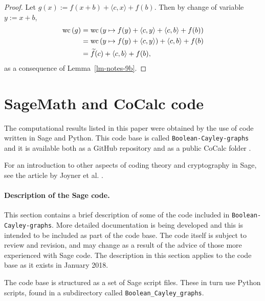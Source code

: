 \begin{proof}
Let $g(x) := f(x+b) + \langle c, x \rangle + f(b)$.
Then by change of variable $y:=x+b$,
\begin{align*}
\operatorname{wc}\left(g\right)
&=
\operatorname{wc}\left(y \mapsto f(y) + \langle c, y \rangle + \langle c, b \rangle + f(b)\right)
\\
&=
\operatorname{wc}\left(y \mapsto f(y) + \langle c, y \rangle\right) + \langle c, b \rangle + f(b)
\\
&=
\widetilde{f}(c) + \langle c, b \rangle + f(b),
\end{align*}
as a consequence of Lemma~\ref{lm-notes-9b}.
\end{proof}


\section{SageMath and CoCalc code}
\label{sec-Code}
The computational results listed in this paper were obtained by the
use of code written in Sage \cite{JoyEtAl13Sage} \cite{SageMath7517} and Python.
This code base is called \texttt{Boolean-Cayley-graphs} and it is available both as a GitHub
repository \cite{Leo16GitHub} and as a public CoCalc \cite{CoCalc} folder
\cite{Leo17CoCalc}.

For an introduction to other aspects of coding theory and cryptography in Sage,
see the article by Joyner et al. \cite{JoyEtAl13Sage}.

\paragraph*{Description of the Sage code.}

This section contains a brief description of some of the code included in
\texttt{Boolean-Cayley-graphs}.
More detailed documentation is being developed and this is intended to be included as part of the code base.
The code itself is subject to review and revision, and may change as a result of the advice of
those more experienced with Sage code.
The description in this section applies to the code base as it exists in January 2018.

The code base is structured as a set of Sage script files. %
These in turn use Python scripts, found in a subdirectory called \texttt{Boolean\_Cayley\_graphs}.

